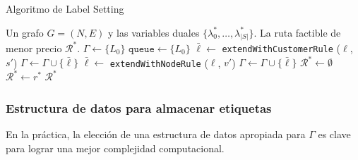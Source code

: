 \begin{algorithm}[H]
  \caption{Algoritmo de Label Setting}
  \label{al:label-setting}
  \begin{algorithmic}[1]
  	\Require Un grafo $G = (N, E)$ y las variables duales $\{\lambda^*_0, \dots, \lambda^*_{|S|}\}$.
  	\Ensure La ruta factible de menor precio $\mathscr{R}^{*}$.
        \State $\Gamma \gets \{L_0\}$
        \State $\texttt{queue} \gets \{L_0\}$
                    \State $\bar{\ell} \gets $ \texttt{extendWithCustomerRule} ($\ell$, $s'$)
                        \State $\Gamma \gets \Gamma \cup \{\bar{\ell}\}$
                    \EndIf
                \EndFor
                    \State $\bar{\ell} \gets $ \texttt{extendWithNodeRule} ($\ell$, $v'$)
                        \State $\Gamma \gets \Gamma \cup \{\bar{\ell}\}$
                    \EndIf
                \EndFor
            \EndIf
        \EndWhile
        \State $\mathscr{R}^{*} \gets \emptyset$
                \State $\mathscr{R}^{*} \gets r^{*}$
            \EndIf
        \EndFor
        \Return $\mathscr{R}^{*}$
  \end{algorithmic}
\end{algorithm}


\subsubsection{Estructura de datos para almacenar etiquetas}

En la práctica, la elección de una estructura de datos apropiada para $\Gamma$ es clave para lograr una mejor complejidad computacional.

